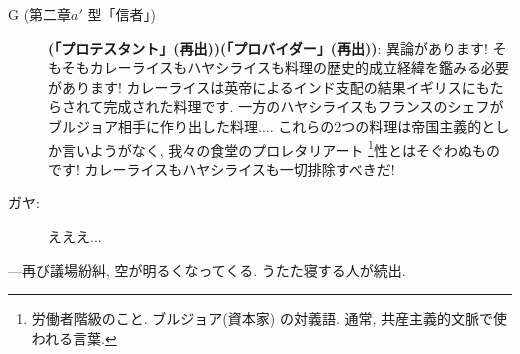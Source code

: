 \documentclass[10pt,b5jsbook,dvips,dvipdfmx,openany]{jsbook}
\theoremstyle{definition}
\begin{document}
\begin{description}
		\item[G (第二章$a'$ 型「信者」)]\textbf{(「プロテスタント」(再出))(「プロバイダー」(再出))}: 異論があります! そもそもカレーライスもハヤシライスも料理の歴史的成立経緯を鑑みる必要があります! カレーライスは英帝によるインド支配の結果イギリスにもたらされて完成された料理です. 一方のハヤシライスもフランスのシェフがブルジョア相手に作り出した料理.... これらの2つの料理は帝国主義的としか言いようがなく, 我々の食堂のプロレタリアート \footnote{労働者階級のこと. ブルジョア(資本家) の対義語. 通常, 共産主義的文脈で使われる言葉. }性とはそぐわぬものです! カレーライスもハヤシライスも一切排除すべきだ!

		\item[ガヤ: ]えええ...

		\end{description}

		---再び議場紛糾, 空が明るくなってくる. うたた寝する人が続出.
\end{document}

